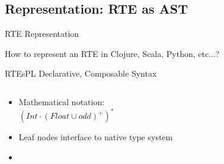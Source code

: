 \subsection{Representation: RTE as AST}


{  %
\begin{frame}{ RTE Representation}

  How to represent an RTE in Clojure, Scala, Python, etc...?


  \medskip
  
\end{frame}
}


\begin{frame}[t]{RTEs}{PL Declarative, Composable Syntax}
  \begin{columns}
    \begin{column}{0.55\textwidth}
  \begin{itemize}
  \item Mathematical notation:\\
  \quad\textcolor{greeny}{$(Int \cdot (Float \cup odd)^+)^*$}

  \item Leaf nodes interface to native type system

  \item {}%
  \end{itemize}
    \end{column}%
    \begin{column}{0.45\textwidth}
      \scalebox{0.7}{}
    \end{column}%
  \end{columns}%
\end{frame}

